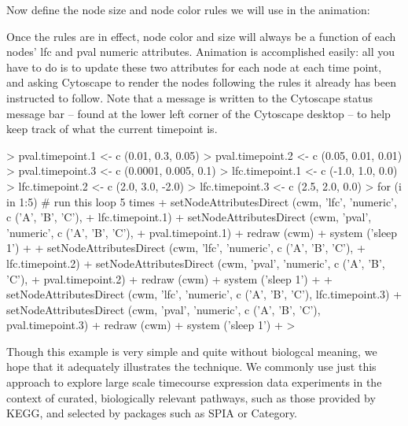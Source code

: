 \documentclass[12pt]{article}
\begin{document}
Now define the node size and node color rules we will use in the animation:

\begin{Schunk}
\end{Schunk}
Once the rules are in effect, node color and size will always be a function of each nodes' lfc and pval numeric attributes.  Animation is accomplished easily:  all you have to do is to update these two attributes for each node at each time point, and asking Cytoscape to render the nodes following the rules it already has been instructed to follow.  Note that a message is written to the Cytoscape status message bar -- found at the lower left corner of the Cytoscape desktop -- to help keep track of what the current timepoint is.
\begin{Schunk}
\begin{Sinput}
>   pval.timepoint.1 <- c (0.01, 0.3, 0.05)
>   pval.timepoint.2 <- c (0.05, 0.01, 0.01)
>   pval.timepoint.3 <- c (0.0001, 0.005, 0.1)
>   lfc.timepoint.1 <- c (-1.0, 1.0, 0.0)
>   lfc.timepoint.2 <- c (2.0, 3.0, -2.0)
>   lfc.timepoint.3 <- c (2.5, 2.0, 0.0)
>   for (i in 1:5) {  # run this loop 5 times
+     setNodeAttributesDirect (cwm, 'lfc',  'numeric', c ('A', 'B', 'C'),
+                              lfc.timepoint.1)
+     setNodeAttributesDirect (cwm, 'pval', 'numeric', c ('A', 'B', 'C'),
+                              pval.timepoint.1)
+     redraw (cwm)
+     system ('sleep 1')
+ 
+     setNodeAttributesDirect (cwm, 'lfc',  'numeric', c ('A', 'B', 'C'),
+                              lfc.timepoint.2)
+     setNodeAttributesDirect (cwm, 'pval', 'numeric', c ('A', 'B', 'C'),
+                              pval.timepoint.2)
+     redraw (cwm)
+     system ('sleep 1')
+ 
+     setNodeAttributesDirect (cwm, 'lfc',  'numeric', c ('A', 'B', 'C'), lfc.timepoint.3)
+     setNodeAttributesDirect (cwm, 'pval', 'numeric', c ('A', 'B', 'C'), pval.timepoint.3)
+     redraw (cwm)
+     system ('sleep 1')
+     }
> 
\end{Sinput}
\end{Schunk}
Though this example is very simple and quite without biologcal meaning, we hope that it adequately illustrates the technique.  We commonly use just this approach to explore large scale timecourse expression data experiments in the context of curated, biologically relevant pathways, such as those provided by KEGG, and selected by packages such as SPIA or Category.
\end{document}
